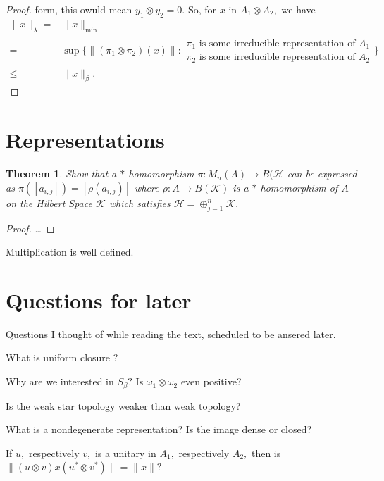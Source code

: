 \documentclass{article}
\theoremstyle{plain}
\newtheorem{theorem}{Theorem}[section]
\theoremstyle{definition}
\theoremstyle{remark}
\begin{document}
\begin{proof}
form, this owuld mean $y_1 \otimes y_2 = 0.$
So, for $x$ in $A_1 \otimes A_2,$ we have
\begin{align*}
	\lVert x \rVert_{\lambda}
	={}& \lVert x \rVert_{\min}  \\
	={}& \sup\{ \lVert (\pi_1 \otimes \pi_2)(x) \rVert
		\colon \begin{array}{c}
		\pi_1 \text{ is some irreducible representation of } A_1 \\ 
		\pi_2 \text{ is some irreducible representation of } A_2
	\end{array} \} \\
		\leq{}& \lVert x \rVert_{\beta}.
\end{align*}
\end{proof}

\appendix

\section{Representations}
\begin{theorem}
	Show that a $\ast$\nobreakdash-homomorphism $\pi \colon M_n(A) \to
	B(\mathcal{H} $ can be expressed as
	$\pi( [a_{i,j}]) = [\rho(a_{i,j})]$ where $\rho \colon A \to B(\mathcal{K})$
	is a $\ast$\nobreakdash-homomorphism of $A$ on the Hilbert Space $\mathcal{K}$
	which satisfies $\mathcal{H} = \oplus_{j=1}^n \mathcal{K}.$
\end{theorem}

\begin{proof}
	\dots
\end{proof}

Multiplication is well defined.



\section{Questions for later}
Questions I thought of while reading the text, scheduled to be ansered later.

What is uniform closure \cite[proof of Prop 4.13 page 211]{takesaki79}?

Why are we interested in $S_\beta?$ Is $\omega_1 \otimes \omega_2$ even positive?

Is the weak star topology weaker than weak topology?

What is a nondegenerate representation? Is the image dense or closed?

If $u,$ respectively $v,$ is a unitary in $A_1,$ respectively $A_2,$ then
is $\lVert (u \otimes v) x (u^\ast \otimes v^\ast) \rVert = \lVert x \rVert?$


\end{document}
